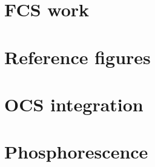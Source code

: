 \section{FCS work}

\section{Reference figures}


\section{OCS integration}

\section{Phosphorescence}\label{appendix:phosphorescence}




